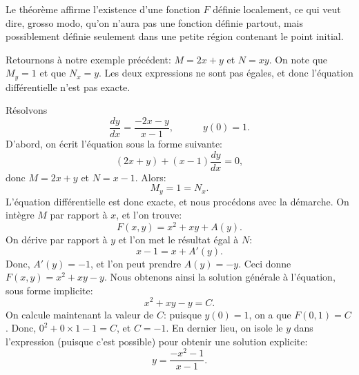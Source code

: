 Le théorème affirme l'existence d'une fonction $F$ \og{}définie localement\fg{}, ce qui veut dire, grosso modo,
qu'on n'aura pas une fonction définie partout, mais possiblement définie seulement dans une petite région contenant le point initial.

Retournons à notre exemple précédent: $M = 2x + y$ et $N = xy$.
On note que $M_y = 1$ et  que $N_x = y$.
Les deux expressions ne sont pas égales, et donc l'équation différentielle n'est pas exacte.

\begin{example}
	Résolvons
	\begin{equation*}
		\frac{dy}{dx} = \frac{-2x-y}{x-1} ,\quad  \qquad y(0) = 1.
	\end{equation*}
	D'abord, on écrit l'équation sous la forme suivante:
	\begin{equation*}
		(2x+y) + (x-1)\frac{dy}{dx} = 0,
	\end{equation*}
	donc $M = 2x+y$ et $N = x-1$.  Alors:
	\begin{equation*}
		M_y = 1 = N_x .
	\end{equation*}
	L'équation différentielle est donc exacte, et nous procédons avec la démarche.
	On intègre $M$ par rapport à $x$, et l'on trouve:
	\begin{equation*}
		F(x,y) = x^2+xy + A(y) .
	\end{equation*}
	On dérive par rapport à $y$ et l'on met le résultat égal à $N$:
	\begin{equation*}
		x-1 = x + A'(y) .
	\end{equation*}
	Donc, $A'(y) = -1$, et l'on peut prendre $A(y) = -y$.  Ceci donne $F(x, y) = x^2+xy-y$.
	Nous obtenons ainsi la solution générale à l'équation, sous forme implicite:
	\begin{equation*}
		x^2+xy-y = C.
	\end{equation*}
	On calcule maintenant la valeur de $C$: puisque $y(0)=1$, on a que
	$F(0,1) = C$.  Donc, $0^2+0\times 1 - 1 = C$, et $C=-1$.
	En dernier lieu, on isole le $y$ dans l'expression (puisque c'est possible) pour obtenir une solution explicite:
	\begin{equation*}
		y = \frac{-x^2-1}{x-1} .
	\end{equation*}
\end{example}

